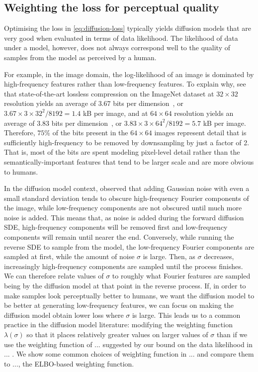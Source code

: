\subsection{Weighting the loss for perceptual quality}
Optimising the loss in \cref{eq:diffusion-loss} typically yields diffusion models that are very good when evaluated in terms of data likelihood. The likelihood of data under a model, however, does not always correspond well to the quality of samples from the model as perceived by a human.

For example, in the image domain, the log-likelihood of an image is dominated by high-frequency features rather than low-frequency features. To explain why, see that state-of-the-art lossless compression on the ImageNet dataset at $32\times32$ resolution yields an average of $3.67$ bits per dimension~\citep{sahoo2023diffusion}, or $3.67\times3\times32^2 / 8192 = 1.4$ kB per image, and at $64\times64$ resolution yields an average of 3.83 bits per dimension~\citep{finlay2020train}, or $3.83\times3\times64^2 / 8192 = 5.7$ kB per image. Therefore, $75\%$ of the bits present in the $64\times64$ images represent detail that is sufficiently high-frequency to be removed by downsampling by just a factor of 2. That is, most of the bits are spent modeling pixel-level detail rather than the semantically-important features that tend to be larger scale and are more obvious to humans.

In the diffusion model context, \citet{yang2023diffusion} observed that adding Gaussian noise with even a small standard deviation tends to obscure high-frequency Fourier components of the image, while low-frequency components are not obscured until much more noise is added. This means that, as noise is added during the forward diffusion SDE, high-frequency components will be removed first and low-frequency components will remain until nearer the end. Conversely, while running the reverse SDE to sample from the model, the low-frequency Fourier components are sampled at first, while the amount of noise $\sigma$ is large. Then, as $\sigma$ decreases, increasingly high-frequency components are sampled until the process finishes. We can therefore relate values of $\sigma$ to roughly what Fourier features are sampled being by the diffusion model at that point in the reverse process. If, in order to make samples look perceptually better to humans, we want the diffusion model to be better at generating low-frequency features, we can focus on making the diffusion model obtain lower loss where $\sigma$ is large. This leads us to a common practice in the diffusion model literature: modifying the weighting function $\lambda(\sigma)$ so that it places relatively greater values on larger values of $\sigma$ than if we use the weighting function of ... suggested by our bound on the data likelihood in ... . We show some common choices of weighting function in ... and compare them to ..., the ELBO-based weighting function.


